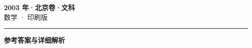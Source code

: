 \documentclass[zihao=5, a4paper]{ctexart}
\begin{document}
\begin{center}
  {\Large\bfseries 2003 年·北京卷·文科}\\[4pt]
  {\large 数学 · 印刷版}
\end{center}
\medskip
{}

\par\bigskip\hrule\bigskip
{}
\begin{center}{\large\bfseries 参考答案与详细解析}\end{center}
\smallskip

\end{document}
